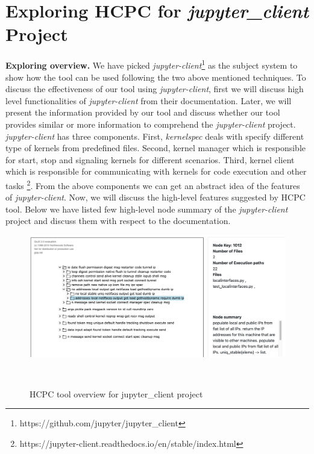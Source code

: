 \section{Exploring HCPC for \emph{jupyter\_client} Project} 
\label{hla3:case_study}
\textbf{Exploring overview. } We have picked \emph{jupyter-client}\footnote{https://github.com/jupyter/jupyter\_client} as the subject system to show how the tool can be used following the two above mentioned techniques. To discuss the effectiveness of our tool using \emph{jupyter-client}, first we will discuss high level functionalities of \emph{jupyter-client} from their documentation. Later, we will present the information provided by our tool and discuss whether our tool provides similar or more information to comprehend the \emph{jupyter-client} project. \emph{jupyter-client} has three components. First, \emph{kernelspec} deals with specify different type of kernels from predefined files. Second, kernel manager which is responsible for start, stop and signaling kernels for different scenarios. Third, kernel client which is responsible for communicating with kernels for code execution and other tasks \footnote{https://jupyter-client.readthedocs.io/en/stable/index.html}. From the above components we can get an abstract idea of the features of \emph{jupyter-client}. Now, we will discuss the high-level features suggested by HCPC tool. Below we have listed few high-level node summary of the \emph{jupyter-client} project and discuss them with respect to the documentation.

\begin{figure}[h]
  \centering
  \includegraphics[width=\columnwidth]{figures/hla3/hla3_jupyter_overview.png}
  \caption{HCPC tool overview for jupyter\_client project }~\label{fig:tool_overview_jupyter_client}
\end{figure}

